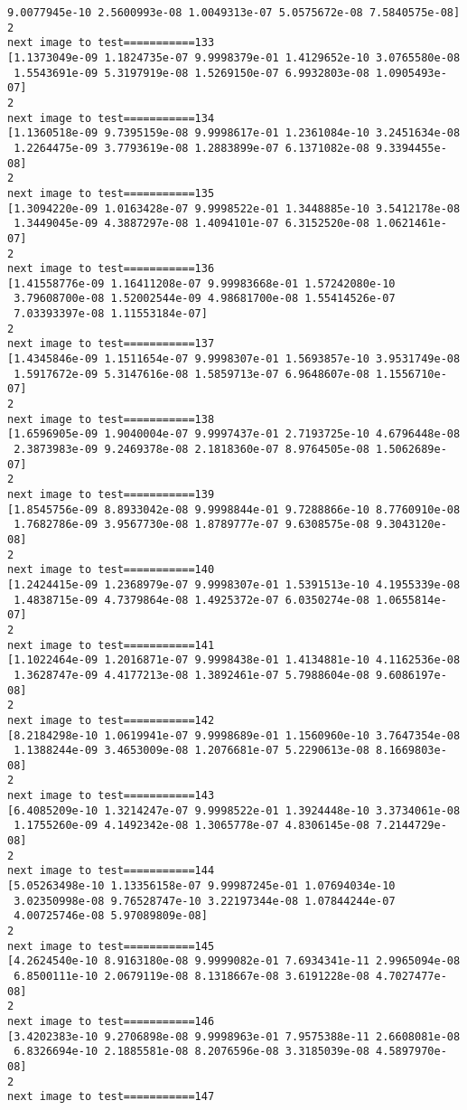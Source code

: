 \documentclass[11pt]{article}
\begin{document}
\begin{Verbatim}[commandchars=\\\{\}]
 9.0077945e-10 2.5600993e-08 1.0049313e-07 5.0575672e-08 7.5840575e-08]
2
next image to test===========133
[1.1373049e-09 1.1824735e-07 9.9998379e-01 1.4129652e-10 3.0765580e-08
 1.5543691e-09 5.3197919e-08 1.5269150e-07 6.9932803e-08 1.0905493e-07]
2
next image to test===========134
[1.1360518e-09 9.7395159e-08 9.9998617e-01 1.2361084e-10 3.2451634e-08
 1.2264475e-09 3.7793619e-08 1.2883899e-07 6.1371082e-08 9.3394455e-08]
2
next image to test===========135
[1.3094220e-09 1.0163428e-07 9.9998522e-01 1.3448885e-10 3.5412178e-08
 1.3449045e-09 4.3887297e-08 1.4094101e-07 6.3152520e-08 1.0621461e-07]
2
next image to test===========136
[1.41558776e-09 1.16411208e-07 9.99983668e-01 1.57242080e-10
 3.79608700e-08 1.52002544e-09 4.98681700e-08 1.55414526e-07
 7.03393397e-08 1.11553184e-07]
2
next image to test===========137
[1.4345846e-09 1.1511654e-07 9.9998307e-01 1.5693857e-10 3.9531749e-08
 1.5917672e-09 5.3147616e-08 1.5859713e-07 6.9648607e-08 1.1556710e-07]
2
next image to test===========138
[1.6596905e-09 1.9040004e-07 9.9997437e-01 2.7193725e-10 4.6796448e-08
 2.3873983e-09 9.2469378e-08 2.1818360e-07 8.9764505e-08 1.5062689e-07]
2
next image to test===========139
[1.8545756e-09 8.8933042e-08 9.9998844e-01 9.7288866e-10 8.7760910e-08
 1.7682786e-09 3.9567730e-08 1.8789777e-07 9.6308575e-08 9.3043120e-08]
2
next image to test===========140
[1.2424415e-09 1.2368979e-07 9.9998307e-01 1.5391513e-10 4.1955339e-08
 1.4838715e-09 4.7379864e-08 1.4925372e-07 6.0350274e-08 1.0655814e-07]
2
next image to test===========141
[1.1022464e-09 1.2016871e-07 9.9998438e-01 1.4134881e-10 4.1162536e-08
 1.3628747e-09 4.4177213e-08 1.3892461e-07 5.7988604e-08 9.6086197e-08]
2
next image to test===========142
[8.2184298e-10 1.0619941e-07 9.9998689e-01 1.1560960e-10 3.7647354e-08
 1.1388244e-09 3.4653009e-08 1.2076681e-07 5.2290613e-08 8.1669803e-08]
2
next image to test===========143
[6.4085209e-10 1.3214247e-07 9.9998522e-01 1.3924448e-10 3.3734061e-08
 1.1755260e-09 4.1492342e-08 1.3065778e-07 4.8306145e-08 7.2144729e-08]
2
next image to test===========144
[5.05263498e-10 1.13356158e-07 9.99987245e-01 1.07694034e-10
 3.02350998e-08 9.76528747e-10 3.22197344e-08 1.07844244e-07
 4.00725746e-08 5.97089809e-08]
2
next image to test===========145
[4.2624540e-10 8.9163180e-08 9.9999082e-01 7.6934341e-11 2.9965094e-08
 6.8500111e-10 2.0679119e-08 8.1318667e-08 3.6191228e-08 4.7027477e-08]
2
next image to test===========146
[3.4202383e-10 9.2706898e-08 9.9998963e-01 7.9575388e-11 2.6608081e-08
 6.8326694e-10 2.1885581e-08 8.2076596e-08 3.3185039e-08 4.5897970e-08]
2
next image to test===========147

\end{Verbatim}
\end{document}
